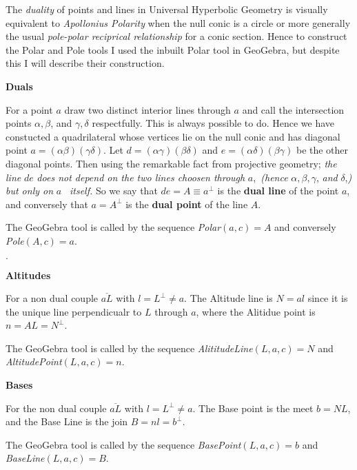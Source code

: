\documentclass{unswthesis}
\begin{document}
\bigskip 

The \textit{duality} of points and lines in Universal Hyperbolic Geometry is
visually equivalent to \textit{Apollonius Polarity} when the null conic is a
circle or more generally the usual \textit{pole-polar reciprical relationship%
} for a conic section. Hence to construct the Polar and Pole tools I used
the inbuilt Polar tool in GeoGebra, but despite this I will describe their
construction.

\bigskip 

\textbf{Duals }

For a point $a$ draw two distinct interior lines through $a$ and call the
intersection points $\alpha ,\beta $, and $\gamma ,\delta $ respectfully.
This is always possible to do. Hence we have constucted a quadrilateral
whose vertices lie on the null conic and has diagonal point $a=\left( \alpha
\beta \right) \left( \gamma \delta \right) $. Let $d=\left( \alpha \gamma
\right) \left( \beta \delta \right) $ and $e=\left( \alpha \delta \right)
\left( \beta \gamma \right) $ be the other diagonal points. Then using the
remarkable fact from projective geometry; \textit{the line }$de$ \textit{%
does not depend on the two lines choosen through }$a$,\textit{\ (hence }$%
\alpha ,\beta ,\gamma $, \textit{and }$\delta $,\textit{) but only on }$a$%
\textit{\ itself.} So we say that $de=A\equiv a^{\perp }$ is the \textbf{%
dual line} of the point $a$, and conversely that $a=A^{\perp }$ is the 
\textbf{dual point} of the line $A$. 

The GeoGebra tool is called by the sequence \textit{Polar}$\left( a,c\right)
=A$ and conversely \textit{Pole}$\left( A,c\right) =a$.

$.$

\textbf{Altitudes}

For a non dual couple $\overline{aL}$ with $l=L^{\perp }\neq a$. The
Altitude line is $N=al$ since it is the unique line perpendicualr to $L$
through $a$, where the Alitidue point is $n=AL=N^{\perp }$.

The GeoGebra tool is called by the sequence \textit{AlititudeLine}$\left(
L,a,c\right) =N$ and \textit{AltitudePoint}$\left( L,a,c\right) =n$.

\textbf{Bases}

For the non dual couple $\overline{aL}$ with $l=L^{\perp }\neq a$. The Base
point is the meet $b=NL$, and the Base Line is the join $B=nl=b^{\perp }$.

The GeoGebra tool is called by the sequence \textit{BasePoint}$\left(
L,a,c\right) =b$ and  \textit{BaseLine}$\left( L,a,c\right) =B$.
\end{document}

